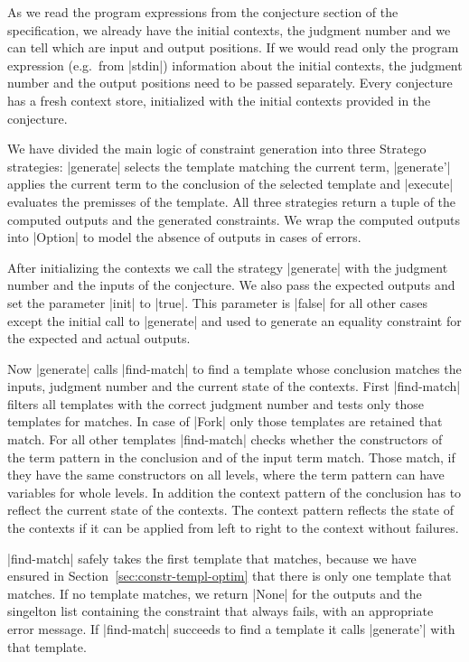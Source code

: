 As we read the program expressions from the conjecture section of the
specification, we already have the initial contexts, the judgment
number and we can tell which are input and output positions. If we
would read only the program expression (e.g.\ from \code|stdin|)
information about the initial contexts, the judgment number and the
output positions need to be passed separately. Every conjecture has a
fresh context store, initialized with the initial contexts provided in
the conjecture.

We have divided the main logic of constraint generation into three
Stratego strategies: \code|generate| selects the template matching the
current term, \code|generate'| applies the current term to the
conclusion of the selected template and \code|execute| evaluates the
premisses of the template. All three strategies return a tuple of the
computed outputs and the generated constraints. We wrap the computed
outputs into \code|Option| to model the absence of outputs in cases of
errors.

After initializing the contexts we call the strategy \code|generate|
with the judgment number and the inputs of the conjecture. We also
pass the expected outputs and set the parameter \code|init| to
\code|true|. This parameter is \code|false| for all other cases except
the initial call to \code|generate| and used to generate an equality
constraint for the expected and actual outputs.

Now \code|generate| calls \code|find-match| to find a template whose
conclusion matches the inputs, judgment number and the current state
of the contexts. First \code|find-match| filters all templates with the
correct judgment number and tests only those templates for matches. In
case of \code|Fork| only those templates are retained that match. For
all other templates \code|find-match| checks whether the constructors
of the term pattern in the conclusion and of the input term
match. Those match, if they have the same constructors on all levels,
where the term pattern can have variables for whole levels. In
addition the context pattern of the conclusion has to reflect the
current state of the contexts. The context pattern reflects the state
of the contexts if it can be applied from left to right to the context
without failures.

\code|find-match| safely takes the first template that matches,
because we have ensured in Section~\ref{sec:constr-templ-optim} that
there is only one template that matches. If no template matches, we
return \code|None| for the outputs and the singelton list containing
the constraint that always fails, with an appropriate error
message. If \code|find-match| succeeds to find a template it calls
\code|generate'| with that template.

